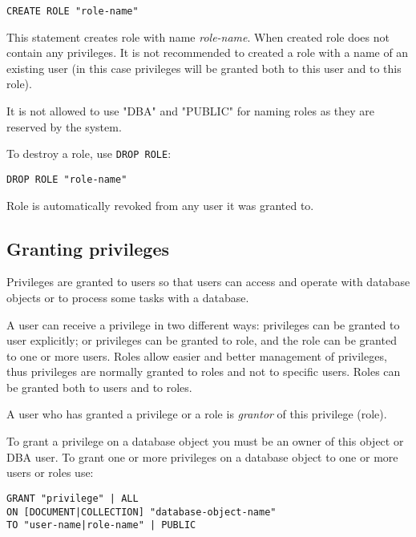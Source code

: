 \documentclass[a4paper,12pt]{article}
\begin{document}
\begin{verbatim}
CREATE ROLE "role-name"
\end{verbatim}

This statement creates role with name \emph{role-name}. When created role does
not contain any privileges. It is not recommended to created a role with a name
of an existing user (in this case privileges will be granted both to this user
and to this role).

It is not allowed to use "DBA" and "PUBLIC" for naming roles as they are
reserved by the system.

To destroy a role, use \verb!DROP ROLE!:

\begin{verbatim}
DROP ROLE "role-name"
\end{verbatim}

Role is automatically revoked from any user it was granted to. 


\subsection{Granting privileges}

Privileges are granted to users so that users can access and operate with
database objects or to process some tasks with a database.

A user can receive a privilege in two different ways: privileges can be granted
to user explicitly; or privileges can be granted to role, and the role can be
granted to one or more users. Roles allow easier and better management of
privileges, thus privileges are normally granted to roles and not to specific
users. Roles can be granted both to users and to roles.

A user who has granted a privilege or a role is \emph{grantor} of this privilege
(role).

To grant a privilege on a database object you must be an owner of this object or
DBA user. To grant one or more privileges on a database object to one or more
users or roles use:

\begin{verbatim}
GRANT "privilege" | ALL
ON [DOCUMENT|COLLECTION] "database-object-name"
TO "user-name|role-name" | PUBLIC
\end{verbatim}
\end{document}
